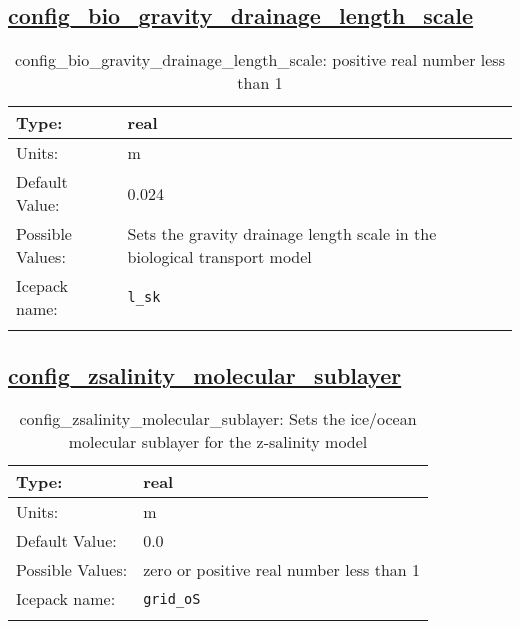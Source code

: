 \subsection[config\_bio\_gravity\_drainage\_length\_scale]{\hyperref[sec:nm_tab_biogeochemistry]{config\_bio\_gravity\_drainage\_length\_scale}}
\label{subsec:nm_sec_config_bio_gravity_drainage_length_scale}
\begin{center}
\begin{longtable}{| p{2.0in} || p{4.0in} |}
    \hline
    Type: & real \\
    \hline
    Units: & \si{m} \\
    \hline
    Default Value: & 0.024 \\
    \hline
    Possible Values: & Sets the gravity drainage length scale in the biological transport model \\
    \hline
    Icepack name: & \verb+l_sk+ \\
    \hline
    \caption{config\_bio\_gravity\_drainage\_length\_scale: positive real number less than 1}
\end{longtable}
\end{center}
\subsection[config\_zsalinity\_molecular\_sublayer]{\hyperref[sec:nm_tab_biogeochemistry]{config\_zsalinity\_molecular\_sublayer}}
\label{subsec:nm_sec_config_zsalinity_molecular_sublayer}
\begin{center}
\begin{longtable}{| p{2.0in} || p{4.0in} |}
    \hline
    Type: & real \\
    \hline
    Units: & \si{m} \\
    \hline
    Default Value: & 0.0 \\
    \hline
    Possible Values: & zero or positive real number less than 1 \\
    \hline
    Icepack name: & \verb+grid_oS+ \\
    \hline
    \caption{config\_zsalinity\_molecular\_sublayer: Sets the ice/ocean molecular sublayer for the z-salinity model}
\end{longtable}
\end{center}
